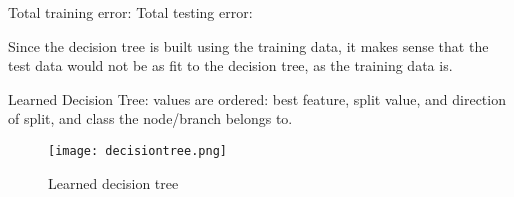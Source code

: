 \documentclass[letterpaper,10pt]{article}
\begin{document}
Total training error:  \newline
Total testing error:  \newline

Since the decision tree is built using the training data, it makes sense that the test data would not be as fit to the decision tree, as the training data is.  

Learned Decision Tree: \newline
values are ordered: best feature, split value, and direction of split, and class the node/branch belongs to.  
     \begin{figure}[ht]
    \centering
   \texttt{[image: decisiontree.png]}
    \caption{Learned decision tree}
    \label{fig:decisionTree}
    \end{figure}	
\end{document}
